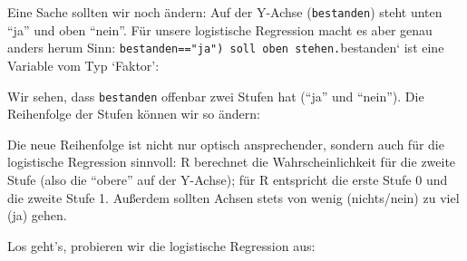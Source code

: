 \documentclass[12pt,ngerman,]{book}
\makeatletter
\newenvironment{Shaded}{\begin{snugshade}}{\end{snugshade}}
\newcommand{\KeywordTok}[1]{\textcolor[rgb]{0.13,0.29,0.53}{\textbf{{#1}}}}
\newcommand{\DataTypeTok}[1]{\textcolor[rgb]{0.13,0.29,0.53}{{#1}}}
\newcommand{\StringTok}[1]{\textcolor[rgb]{0.31,0.60,0.02}{{#1}}}
\newcommand{\CommentTok}[1]{\textcolor[rgb]{0.56,0.35,0.01}{\textit{{#1}}}}
\newcommand{\NormalTok}[1]{{#1}}
\newenvironment{kframe}{%
\medskip{}
\setlength{\fboxsep}{.8em}
 \def\at@end@of@kframe{}%
 \ifinner\ifhmode%
  \def\at@end@of@kframe{\end{minipage}}%
  \begin{minipage}{\columnwidth}%
 \fi\fi%
 \def\FrameCommand##1{\hskip\@totalleftmargin \hskip-\fboxsep
 \colorbox{shadecolor}{##1}\hskip-\fboxsep
     \hskip-\linewidth \hskip-\@totalleftmargin \hskip\columnwidth}%
 \MakeFramed {\advance\hsize-\width
   \@totalleftmargin\z@ \linewidth\hsize
   \@setminipage}}%
 {\par\unskip\endMakeFramed%
 \at@end@of@kframe}
\renewenvironment{Shaded}{\begin{kframe}}{\end{kframe}}
\theoremstyle{definition}
\theoremstyle{definition}
\theoremstyle{remark}
\makeatother
\begin{document}
Eine Sache sollten wir noch ändern: Auf der Y-Achse (\texttt{bestanden})
steht unten ``ja'' und oben ``nein''. Für unsere logistische Regression
macht es aber genau anders herum Sinn:
\texttt{bestanden=="ja")\ soll\ oben\ stehen.}bestanden` ist eine
Variable vom Typ `Faktor':

\begin{Shaded}
\end{Shaded}

Wir sehen, dass \texttt{bestanden} offenbar zwei Stufen hat (``ja'' und
``nein''). Die Reihenfolge der Stufen können wir so ändern:

\begin{Shaded}
\end{Shaded}

Die neue Reihenfolge ist nicht nur optisch ansprechender, sondern auch
für die logistische Regression sinnvoll: R berechnet die
Wahrscheinlichkeit für die zweite Stufe (also die ``obere'' auf der
Y-Achse); für R entspricht die erste Stufe 0 und die zweite Stufe 1.
Außerdem sollten Achsen stets von wenig (nichts/nein) zu viel (ja)
gehen.

Los geht's, probieren wir die logistische Regression aus:
\end{document}
